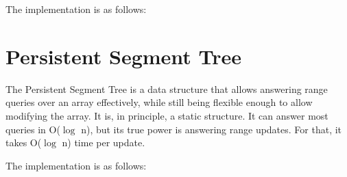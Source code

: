 The implementation is as follows:






\section{Persistent Segment Tree}

The Persistent Segment Tree is a data structure that allows answering range queries over an array effectively, while still being flexible enough to allow modifying the array. It is, in principle, a static structure. It can answer most queries in O($\log$ n), but its true power is answering range updates. For that, it takes O($\log$ n) time per update.

The implementation is as follows:


